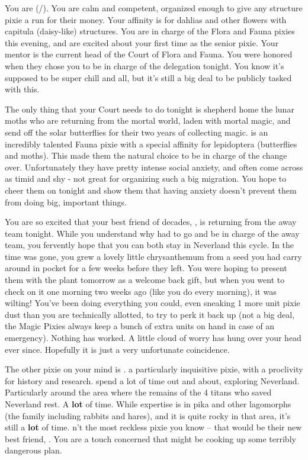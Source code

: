 \documentclass[char]{PP}
\begin{document}
\name{\cFHead{}}

You are \cFHead{} (\cFHead{\They}/\cFHead{\Them}). You are calm and competent, organized enough to give any structure pixie a run for their money. Your affinity is for dahlias and other flowers with capitula (daisy-like) structures. You are in charge of the Flora and Fauna pixies this evening, and are excited about your first time as the senior pixie. Your mentor is the current head of the Court of Flora and Fauna. You were honored when they chose you to be in charge of the delegation tonight. You know it’s supposed to be super chill and all, but it’s still a big deal to be publicly tasked with this.

The only thing that your Court needs to do tonight is shepherd home the lunar moths who are returning from the mortal world, laden with mortal magic, and send off the solar butterflies for their two years of collecting magic. \cFButterfly{} is an incredibly talented Fauna pixie with a special affinity for lepidoptera (butterflies and moths). This made them the natural choice to be in charge of the change over. Unfortunately they have pretty intense social anxiety, and often come across as timid and shy - not great for organizing such a big migration. You hope to cheer them on tonight and show them that having anxiety doesn’t prevent them from doing big, important things.

You are so excited that your best friend of decades, \cSPM{}, is returning from the away team tonight. While you understand why \cSPM{\they} had to go and be in charge of the away team, you fervently hope that you can both stay in Neverland this cycle. In the time \cSPM{} was gone, you grew a lovely little chrysanthemum from a seed you had \cSPM{\them} carry around in \cSPM{\their} pocket for a few weeks before they left. You were hoping to present them with the plant tomorrow as a welcome back gift, but when you went to check on it one morning two weeks ago (like you do every morning), it was wilting! You’ve been doing everything you could, even sneaking 1 more unit pixie dust than you are technically allotted, to try to perk it back up (not a big deal, the Magic Pixies always keep a bunch of extra units on hand in case of an emergency). Nothing has worked. A little cloud of worry has hung over your head ever since. Hopefully it is just a very unfortunate coincidence.

The other pixie on your mind is \cFTitan{}. \cFTitan{\They} \cFTitan{\are} a particularly inquisitive pixie, with a proclivity for history and research. \cFTitan{\They} spend\cFTitan{\plural} a lot of time out and about, exploring Neverland. Particularly around the area where the remains of the 4 titans who saved Neverland rest. A \textbf{lot} of time. While \cFTitan{\their} expertise is in pika and other lagomorphs (the family including rabbits and hares), and it is quite rocky in that area, it’s still a \textbf{lot} of time. \cFTitan{\Theyare}n’t the most reckless pixie you know -- that would be their new best friend, \cEAirship{}. You are a touch concerned that \cFTitan{} might be cooking up some terribly dangerous plan.
\end{document}
